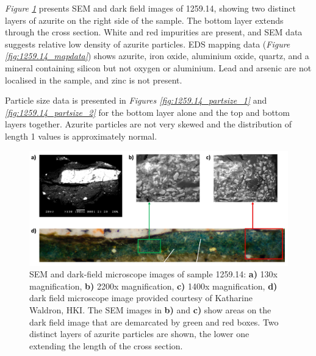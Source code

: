 \textit{Figure \ref{fig:1259.14_imgs}} presents SEM and dark field images of 1259.14, showing two distinct layers of azurite on the right side of the sample. The bottom layer extends through the cross section. White and red impurities are present, and SEM data suggests relative low density of azurite particles. EDS mapping data (\textit{Figure \ref{fig:1259.14_mapdata}}) shows azurite, iron oxide, aluminium oxide, quartz, and a mineral containing silicon but not oxygen or aluminium. Lead and arsenic are not localised in the sample, and zinc is not present. 

Particle size data is presented in \textit{Figures \ref{fig:1259.14_partsize_1}} and \textit{\ref{fig:1259.14_partsize_2}} for the bottom layer alone and the top and bottom layers together. Azurite particles are not very skewed and the distribution of length 1 values is approximately normal. 

\begin{figure}[H]
  \centering
  \includegraphics[width=\linewidth]{1259-14_imgs}
\caption[SEM and dark-field microscope images of sample 1259.14.]{SEM and dark-field microscope images of sample 1259.14: \textbf{a)} 130x magnification, \textbf{b)} 2200x magnification, \textbf{c)} 1400x magnification, \textbf{d)} dark field microscope image provided courtesy of Katharine Waldron, HKI. The SEM images in \textbf{b)} and \textbf{c)} show areas on the dark field image that are demarcated by green and red boxes. Two distinct layers of azurite particles are shown, the lower one extending the length of the cross section.}
\label{fig:1259.14_imgs}
\end{figure}

